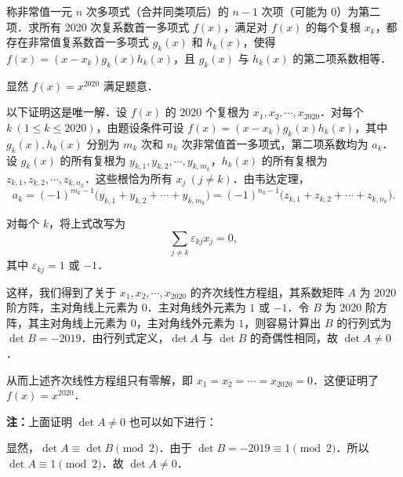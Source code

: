 称非常值一元 $n$ 次多项式（合并同类项后）的 $n-1$ 次项（可能为 $0$）为第二项．求所有 2020 次复系数首一多项式 $f(x)$，满足对 $f(x)$ 的每个复根 $x_k$，都存在非常值复系数首一多项式 $g_k(x)$ 和 $h_k(x)$，使得 $f(x)=(x-x_k)g_k(x)h_k(x)$，且 $g_k(x)$ 与 $h_k(x)$ 的第二项系数相等．
\begin{solution}
显然 $f(x)=x^{2020}$ 满足题意．

以下证明这是唯一解．设 $f(x)$ 的 $2020$ 个复根为 $x_1,x_2,\cdots,x_{2020}$．对每个 $k\ (1\leqslant k\leqslant 2020)$，由题设条件可设 $f(x)=(x-x_k)g_k(x)h_k(x)$，其中 $g_k(x),h_k(x)$ 分别为 $m_k$ 次和 $n_k$ 次非常值首一多项式，第二项系数均为 $a_k$．设 $g_k(x)$ 的所有复根为 $y_{k,1},y_{k,2},\cdots,y_{k,m_k}$，$h_k(x)$ 的所有复根为 $z_{k,1},z_{k,2},\cdots,z_{k,n_k}$．这些根恰为所有 $x_j\ (j\neq k)$．由韦达定理，
\[
  a_k=(-1)^{m_k-1}\bigl(y_{k,1}+y_{k,2}+\cdots+y_{k,m_k}\bigr)
  =(-1)^{n_k-1}\bigl(z_{k,1}+z_{k,2}+\cdots+z_{k,n_k}\bigr).
\]

对每个 $k$，将上式改写为
\[
  \sum_{j\neq k}\varepsilon_{kj}x_j=0,
\]
其中 $\varepsilon_{kj}=1$ 或 $-1$．

这样，我们得到了关于 $x_1,x_2,\cdots,x_{2020}$ 的齐次线性方程组，其系数矩阵 $A$ 为 $2020$ 阶方阵，主对角线上元素为 $0$．主对角线外元素为 $1$ 或 $-1$．令 $B$ 为 $2020$ 阶方阵，其主对角线上元素为 $0$，主对角线外元素为 $1$，则容易计算出 $B$ 的行列式为 $\det B=-2019$．由行列式定义，$\det A$ 与 $\det B$ 的奇偶性相同，故 $\det A\neq 0$．

从而上述齐次线性方程组只有零解，即 $x_1=x_2=\cdots=x_{2020}=0$．这便证明了 $f(x)=x^{2020}$．

\textbf{注：}上面证明 $\det A\neq 0$ 也可以如下进行：

显然，$\det A\equiv\det B\pmod 2$．由于 $\det B=-2019\equiv 1\pmod 2$．所以 $\det A\equiv 1\pmod 2$．故 $\det A\neq 0$．
\end{solution}

